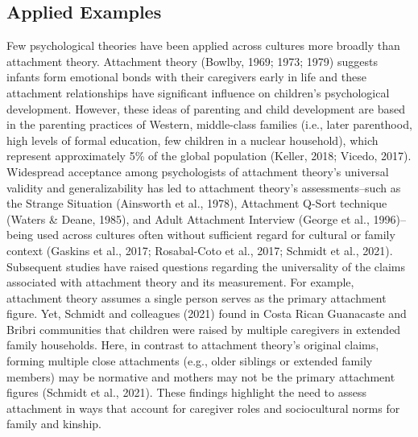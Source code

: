 \documentclass[
  11pt,
]{book}
\begin{document}
\subsection{Applied Examples}\label{applied-examples}

Few psychological theories have been applied across cultures more broadly than attachment theory. Attachment theory (Bowlby, 1969; 1973; 1979) suggests infants form emotional bonds with their caregivers early in life and these attachment relationships have significant influence on children's psychological development. However, these ideas of parenting and child development are based in the parenting practices of Western, middle-class families (i.e., later parenthood, high levels of formal education, few children in a nuclear household), which represent approximately 5\% of the global population (Keller, 2018; Vicedo, 2017). Widespread acceptance among psychologists of attachment theory's universal validity and generalizability has led to attachment theory's assessments--such as the Strange Situation (Ainsworth et al., 1978), Attachment Q-Sort technique (Waters \& Deane, 1985), and Adult Attachment Interview (George et al., 1996)--being used across cultures often without sufficient regard for cultural or family context (Gaskins et al., 2017; Rosabal-Coto et al., 2017; Schmidt et al., 2021). Subsequent studies have raised questions regarding the universality of the claims associated with attachment theory and its measurement. For example, attachment theory assumes a single person serves as the primary attachment figure. Yet, Schmidt and colleagues (2021) found in Costa Rican Guanacaste and Bribri communities that children were raised by multiple caregivers in extended family households. Here, in contrast to attachment theory's original claims, forming multiple close attachments (e.g., older siblings or extended family members) may be normative and mothers may not be the primary attachment figures (Schmidt et al., 2021). These findings highlight the need to assess attachment in ways that account for caregiver roles and sociocultural norms for family and kinship.
\end{document}
